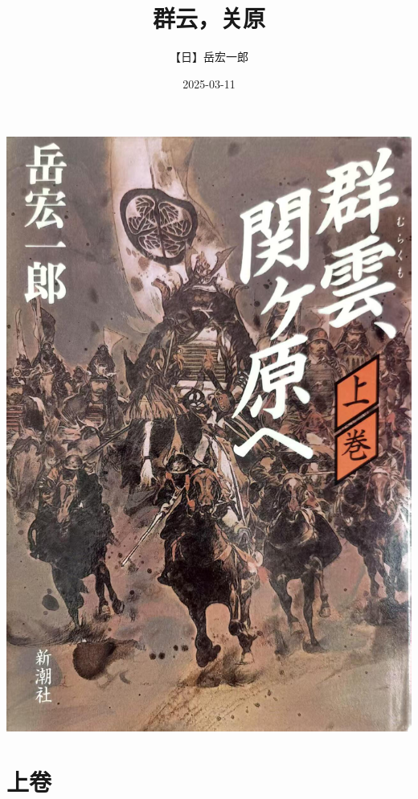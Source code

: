 \documentclass[
]{article}
\title{群云，关原}
\author{【日】岳宏一郎}
\date{2025-03-11}
\begin{document}
\maketitle

{
\setcounter{tocdepth}{2}
\tableofcontents
}
\section*{}\label{section}

\includegraphics[width=1\textwidth,height=\textheight]{image/cover.jpg}

\part*{上卷}\label{part-ux4e0aux5377}
\end{document}
